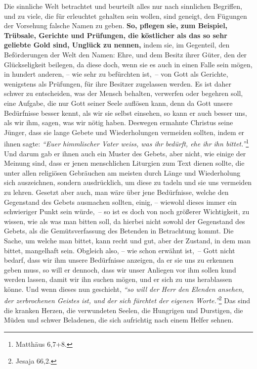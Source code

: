 \medskip

\label{ref:06_13_auf_die_probe_gestellt}
Die sinnliche Welt betrachtet und beurteilt alles nur nach sinnlichen
Begriffen, und zu viele, die für erleuchtet
gehalten sein wollen, sind
geneigt, den Fügungen der Vorsehung falsche Namen zu geben.
\textbf{So, pflegen
sie, zum
Beispiel, Trübsale, Gerichte und Prüfungen, die köstlicher
als das so sehr
geliebte Gold sind, Unglück zu nennen,} indem sie, im
Gegenteil, den
Beförderungen der Welt den Namen: Ehre, und dem Besitz ihrer Güter, den der
Glückseligkeit beilegen, da diese doch, wenn sie es auch
in einen Falle sein
mögen, in hundert anderen, -- wie sehr zu befürchten ist,~-- von Gott als
Gerichte, wenigstens als Prüfungen, für ihre Besitzer zugelassen
werden. Es ist
daher schwer zu entscheiden, was der Mensch behalten, verwerfen oder begehren
soll, eine Aufgabe, die nur Gott seiner Seele auflösen
kann, denn da Gott unsere
Bedürfnisse besser kennt, als wir sie
selbst einsehen, so kann er auch besser
uns, als wir ihm, sagen, was wir nötig haben. Deswegen ermahnte Christus seine
Jünger, dass sie lange Gebete und Wiederholungen vermeiden sollten, indem er
ihnen sagte:
\textit{"`Euer himmlischer Vater weiss, was ihr bedürft, ehe ihr ihn
bittet."'}\footnote{Matthäus 6,7+8.}
Und darum gab er ihnen auch ein Muster des
Gebets, aber nicht, wie einige der Meinung sind, dass er jenen menschlichen
Liturgien zum Text dienen sollte, die unter allen religiösen Gebräuchen am
meisten durch Länge und Wiederholung sich auszeichnen, sondern ausdrücklich,
um diese zu tadeln und sie uns vermeiden zu lehren. Gesetzt aber auch, man wäre
über jene Bedürfnisse, welche den Gegenstand des Gebets ausmachen sollten,
einig, -- wiewohl dieses immer ein schwieriger Punkt sein würde,~-- so ist es
doch von noch größerer Wichtigkeit, zu wissen, wie als was man bitten soll, da
hierbei nicht sowohl der Gegenstand des Gebets, als die Gemütsverfassung des
Betenden in Betrachtung kommt. Die Sache, um welche man bittet, kann recht und
gut, aber der Zustand, in dem man bittet, mangelhaft sein. Obgleich also, -- wie
schon erwähnt ist,~-- Gott nicht bedarf, dass wir ihm unsere Bedürfnisse
anzeigen, da er sie uns zu erkennen geben muss, so will er dennoch, dass wir
unser Anliegen vor ihm sollen kund werden lassen, damit wir ihn suchen mögen,
und er sich zu uns herablassen könne. Und wenn dieses nun geschieht,
\textit{"`so will der Herr den Elenden ansehen, der zerbrochenen Geistes ist,
und der sich fürchtet der eigenen Worte."'}\footnote{Jesaja 66,2.}
Das sind die kranken Herzen, die
verwundeten Seelen, die Hungrigen und Durstigen, die Müden
und schwer Beladenen,
die sich aufrichtig nach einem Helfer sehnen.

